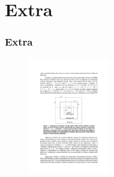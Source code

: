 \documentclass[xcolor={table}]{beamer}
\begin{document}
\section{Extra}
\begin{frame}\frametitle{Extra}
\begin{figure}[t]
  \begin{minipage}[b]{0.9\textwidth}
	\centering
    \includegraphics[height=5cm]{figs/tile.pdf} \\
	\label{fig:block2d}
  \end{minipage}
\end{figure}
\end{frame}
\end{document}
